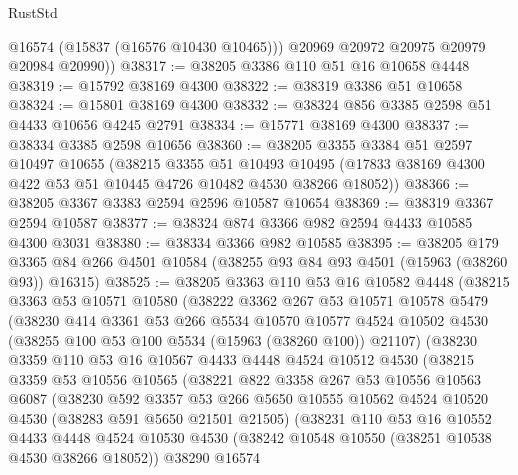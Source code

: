 \begin{lexlean}{RustStd}
\begin{coremodule}
          @16574
          (@15837 (@16576 @10430 @10465)))
        @20969
        @20972
        @20975
        @20979
        @20984
        @20990))
@38317 := @38205 @3386 @110 @51 @16 @10658 @4448
@38319 := @15792 @38169 @4300
@38322 := @38319 @3386 @51 @10658
@38324 := @15801 @38169 @4300
@38332 := @38324 @856 @3385 @2598 @51 @4433 @10656 @4245 @2791
@38334 := @15771 @38169 @4300
@38337 := @38334 @3385 @2598 @10656
@38360 := @38205
    @3355
    @3384
    @51
    @2597
    @10497
    @10655
    (@38215
      @3355
      @51
      @10493
      @10495
      (@17833 @38169 @4300 @422 @53 @51 @10445 @4726 @10482 @4530 @38266 @18052))
@38366 := @38205 @3367 @3383 @2594 @2596 @10587 @10654
@38369 := @38319 @3367 @2594 @10587
@38377 := @38324 @874 @3366 @982 @2594 @4433 @10585 @4300 @3031
@38380 := @38334 @3366 @982 @10585
@38395 := @38205
    @179
    @3365
    @84
    @266
    @4501
    @10584
    (@38255 @93 @84 @93 @4501 (@15963 (@38260 @93)) @16315)
@38525 := @38205
    @3363
    @110
    @53
    @16
    @10582
    @4448
    (@38215
      @3363
      @53
      @10571
      @10580
      (@38222
        @3362
        @267
        @53
        @10571
        @10578
        @5479
        (@38230
          @414
          @3361
          @53
          @266
          @5534
          @10570
          @10577
          @4524
          @10502
          @4530
          (@38255 @100 @53 @100 @5534 (@15963 (@38260 @100)) @21107)
          (@38230
            @3359
            @110
            @53
            @16
            @10567
            @4433
            @4448
            @4524
            @10512
            @4530
            (@38215
              @3359
              @53
              @10556
              @10565
              (@38221
                @822
                @3358
                @267
                @53
                @10556
                @10563
                @6087
                (@38230
                  @592
                  @3357
                  @53
                  @266
                  @5650
                  @10555
                  @10562
                  @4524
                  @10520
                  @4530
                  (@38283 @591 @5650 @21501 @21505)
                  (@38231
                    @110
                    @53
                    @16
                    @10552
                    @4433
                    @4448
                    @4524
                    @10530
                    @4530
                    (@38242 @10548 @10550 (@38251 @10538 @4530 @38266 @18052))
                    @38290
                    @16574

\end{coremodule}
\end{lexlean}
